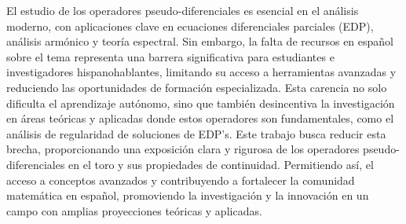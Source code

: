 El estudio de los operadores pseudo-diferenciales es esencial en el análisis moderno, con aplicaciones clave en ecuaciones diferenciales parciales (EDP), análisis armónico y teoría espectral. Sin embargo, la falta de recursos en español sobre el tema representa una barrera significativa para estudiantes e investigadores hispanohablantes, limitando su acceso a herramientas avanzadas y reduciendo las oportunidades de formación especializada. Esta carencia no solo dificulta el aprendizaje autónomo, sino que también desincentiva la investigación en áreas teóricas y aplicadas donde estos operadores son fundamentales, como el análisis de regularidad de soluciones de EDP's. Este trabajo busca reducir esta brecha, proporcionando una exposición clara y rigurosa de los operadores pseudo-diferenciales en el toro y sus propiedades de continuidad. Permitiendo así, el acceso a conceptos avanzados y contribuyendo a fortalecer la comunidad matemática en español, promoviendo la investigación y la innovación en un campo con amplias proyecciones teóricas y aplicadas.

